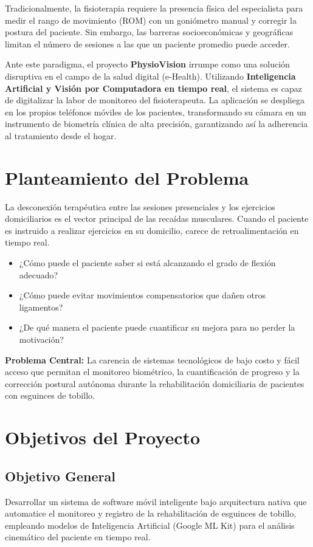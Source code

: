 \documentclass[12pt, a4paper]{article}
\begin{document}
Tradicionalmente, la fisioterapia requiere la presencia física del especialista para medir el rango de movimiento (ROM) con un goniómetro manual y corregir la postura del paciente. Sin embargo, las barreras socioeconómicas y geográficas limitan el número de sesiones a las que un paciente promedio puede acceder. 

Ante este paradigma, el proyecto \textbf{PhysioVision} irrumpe como una solución disruptiva en el campo de la salud digital (e-Health). Utilizando \textbf{Inteligencia Artificial y Visión por Computadora en tiempo real}, el sistema es capaz de digitalizar la labor de monitoreo del fisioterapeuta. La aplicación se despliega en los propios teléfonos móviles de los pacientes, transformando su cámara en un instrumento de biometría clínica de alta precisión, garantizando así la adherencia al tratamiento desde el hogar.

\section{Planteamiento del Problema}
La desconexión terapéutica entre las sesiones presenciales y los ejercicios domiciliarios es el vector principal de las recaídas musculares. Cuando el paciente es instruido a realizar ejercicios en su domicilio, carece de retroalimentación en tiempo real. 
\begin{itemize}
    \item ¿Cómo puede el paciente saber si está alcanzando el grado de flexión adecuado?
    \item ¿Cómo puede evitar movimientos compensatorios que dañen otros ligamentos?
    \item ¿De qué manera el paciente puede cuantificar su mejora para no perder la motivación?
\end{itemize}

\textbf{Problema Central:} La carencia de sistemas tecnológicos de bajo costo y fácil acceso que permitan el monitoreo biométrico, la cuantificación de progreso y la corrección postural autónoma durante la rehabilitación domiciliaria de pacientes con esguinces de tobillo.

\section{Objetivos del Proyecto}
\subsection{Objetivo General}
Desarrollar un sistema de software móvil inteligente bajo arquitectura nativa que automatice el monitoreo y registro de la rehabilitación de esguinces de tobillo, empleando modelos de Inteligencia Artificial (Google ML Kit) para el análisis cinemático del paciente en tiempo real.
\end{document}
